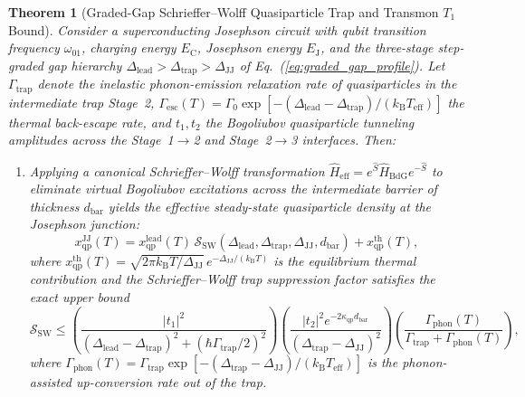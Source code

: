 \documentclass[11pt,letterpaper]{article}
\newtheorem{theorem}{Theorem}
\theoremstyle{definition}
\begin{document}
\begin{theorem}[Graded-Gap Schrieffer--Wolff Quasiparticle Trap and Transmon $T_1$ Bound]
\label{thm:qp_trap_bound}
Consider a superconducting Josephson circuit with qubit transition frequency $\omega_{01}$, charging energy $E_{\mathrm{C}}$, Josephson energy $E_{\mathrm{J}}$, and the three-stage step-graded gap hierarchy $\Delta_{\mathrm{lead}} > \Delta_{\mathrm{trap}} > \Delta_{\mathrm{JJ}}$ of Eq.~(\ref{eq:graded_gap_profile}). Let $\Gamma_{\mathrm{trap}}$ denote the inelastic phonon-emission relaxation rate of quasiparticles in the intermediate trap Stage~2, $\Gamma_{\mathrm{esc}}(T) = \Gamma_0 \exp[-(\Delta_{\mathrm{lead}} - \Delta_{\mathrm{trap}})/(k_{\mathrm{B}} T_{\mathrm{eff}})]$ the thermal back-escape rate, and $t_1, t_2$ the Bogoliubov quasiparticle tunneling amplitudes across the Stage~1$\to$2 and Stage~2$\to$3 interfaces. Then:
\begin{enumerate}
  \item[(i)] Applying a canonical Schrieffer--Wolff transformation $\hat{H}_{\mathrm{eff}} = e^{\hat{S}} \hat{H}_{\mathrm{BdG}} e^{-\hat{S}}$ to eliminate virtual Bogoliubov excitations across the intermediate barrier of thickness $d_{\mathrm{bar}}$ yields the effective steady-state quasiparticle density at the Josephson junction:
  \begin{equation}
    x_{\mathrm{qp}}^{\mathrm{JJ}}(T) = x_{\mathrm{qp}}^{\mathrm{lead}}(T) \, \mathcal{S}_{\mathrm{SW}}(\Delta_{\mathrm{lead}}, \Delta_{\mathrm{trap}}, \Delta_{\mathrm{JJ}}, d_{\mathrm{bar}}) + x_{\mathrm{qp}}^{\mathrm{th}}(T),
    \label{eq:thm2_xqp_jj}
  \end{equation}
  where $x_{\mathrm{qp}}^{\mathrm{th}}(T) = \sqrt{2\pi k_{\mathrm{B}} T / \Delta_{\mathrm{JJ}}}\,e^{-\Delta_{\mathrm{JJ}}/(k_{\mathrm{B}} T)}$ is the equilibrium thermal contribution and the Schrieffer--Wolff trap suppression factor satisfies the exact upper bound
  \begin{equation}
    \mathcal{S}_{\mathrm{SW}} \le \left(\frac{|t_1|^2}{(\Delta_{\mathrm{lead}} - \Delta_{\mathrm{trap}})^2 + (\hbar\Gamma_{\mathrm{trap}}/2)^2}\right) \left(\frac{|t_2|^2 e^{-2\kappa_{\mathrm{qp}} d_{\mathrm{bar}}}}{(\Delta_{\mathrm{trap}} - \Delta_{\mathrm{JJ}})^2}\right) \left(\frac{\Gamma_{\mathrm{phon}}(T)}{\Gamma_{\mathrm{trap}} + \Gamma_{\mathrm{phon}}(T)}\right),
    \label{eq:thm2_sw_factor}
  \end{equation}
  where $\Gamma_{\mathrm{phon}}(T) = \Gamma_{\mathrm{trap}} \exp[-(\Delta_{\mathrm{trap}} - \Delta_{\mathrm{JJ}})/(k_{\mathrm{B}} T_{\mathrm{eff}})]$ is the phonon-assisted up-conversion rate out of the trap.

\end{enumerate}
\end{theorem}
\end{document}
